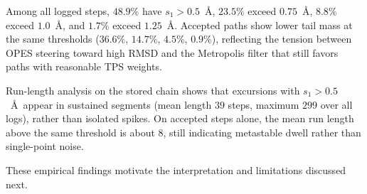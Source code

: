 Among all logged steps, $48.9\%$ have $s_1 > 0.5$~\AA, $23.5\%$ exceed
$0.75$~\AA, $8.8\%$ exceed $1.0$~\AA, and $1.7\%$ exceed $1.25$~\AA.
Accepted paths show lower tail mass at the same thresholds ($36.6\%$,
$14.7\%$, $4.5\%$, $0.9\%$), reflecting the tension between OPES steering toward
high RMSD and the Metropolis filter that still favors paths with reasonable TPS
weights.

Run-length analysis on the stored chain shows that excursions with
$s_1 > 0.5$~\AA\ appear in sustained segments (mean length $39$ steps, maximum
$299$ over all logs), rather than isolated spikes. On accepted steps alone, the
mean run length above the same threshold is about $8$, still indicating
metastable dwell rather than single-point noise.

These empirical findings motivate the interpretation and limitations discussed
next.
